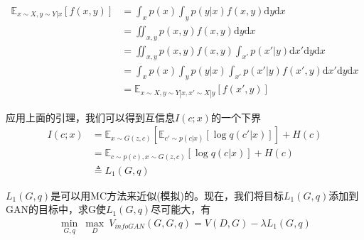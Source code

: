             \begin{Proof}
            \begin{align*}
            \mathbb{E}_{x\sim X,y\sim Y|x}[f(x,y)] &=\int_xp(x)\int_yp(y|x)f(x,y)\mathrm{d}y\mathrm{d}x\\
            &=\iint_{x,y}p(x,y)f(x,y)\mathrm{d}y\mathrm{d}x\\
            &=\iint_{x,y}p(x,y)f(x,y)\int_{x'}p(x'|y)\mathrm{d}x'\mathrm{d}y\mathrm{d}x\\
            &=\int_x p(x)\int_y p(y|x)\int_{x'}p(x'|y)f(x',y)\mathrm{d}x'\mathrm{d}y\mathrm{d}x\\
            &=\mathbb{E}_{x\sim X,y\sim Y|x,x'\sim X|y}[f(x',y)]
            \end{align*}
            \end{Proof}
            \par
            应用上面的引理，我们可以得到互信息$I(c;x)$的一个下界
            \begin{align*}
            I(c;x) &= \mathbb{E}_{x\sim G(z,c)} \left[ \mathbb{E}_{c'\sim p(c|x)}[\log q(c'|x)] \right]+H(c)\\
            &=\mathbb{E}_{c\sim p(c),x\sim G(z,c)}[\log q(c|x)]+H(c)\\
            &\triangleq L_1(G,q)
            \end{align*}
            \par
            $L_1(G,q)$是可以用MC方法来近似(模拟)的。现在，我们将目标$L_1(G,q)$添加到GAN的目标中，求G使$L_1(G,q)$尽可能大，有
            \begin{align*}
            \min_{G,q} \ \max_D\ V_{infoGAN}(G,G,q) = V(D,G) - \lambda L_1(G,q)
            \end{align*}
